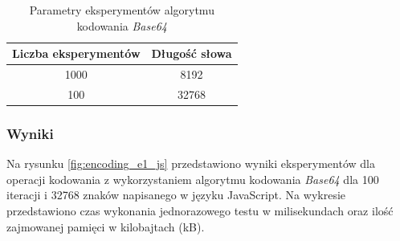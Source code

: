 \begin{table}[H]
  \centering
  \caption{Parametry eksperymentów algorytmu kodowania \textit{Base64}}
  \begin{tabular}{|c|c|}
    \hline
    \textbf{Liczba eksperymentów} & \textbf{Długość słowa}\\ \hline
    1000 & 8192 \\ \hline
    100 & 32768 \\ \hline
  \end{tabular}
  \label{tab:encoding_experiments}
\end{table}

\subsubsection{Wyniki}
Na rysunku \ref{fig:encoding_e1_js} przedstawiono wyniki eksperymentów dla operacji kodowania z wykorzystaniem algorytmu kodowania \textit{Base64} dla 100 iteracji i 32768 znaków napisanego w języku JavaScript. Na wykresie przedstawiono czas wykonania jednorazowego testu w milisekundach oraz ilość zajmowanej pamięci w kilobajtach (kB).

